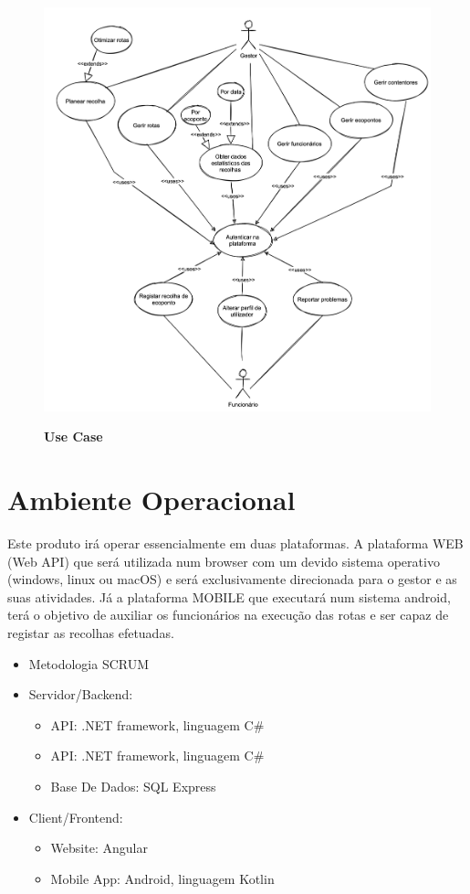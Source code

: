 \documentclass{scrreprt}
\begin{document}
	\begin{figure}[H]
		\centering
		\includegraphics[scale=.60]{imagens/UseCase3}
		\par \textbf{Use Case}
		\label{fig:UseCase3}
	\end{figure}
	
	\newpage
	
	\section{Ambiente Operacional}
	Este produto irá operar essencialmente em duas plataformas.
	A plataforma WEB (Web API) que será utilizada num browser com um devido sistema operativo (windows, linux ou macOS) e será exclusivamente direcionada para o gestor e as suas atividades. Já a plataforma MOBILE que executará num sistema android, terá o objetivo de auxiliar os funcionários na execução das rotas e ser capaz de registar as recolhas efetuadas.
	
	\begin{itemize}
		\item Metodologia SCRUM
		\item Servidor/Backend:
		\begin{itemize}
			\item API: .NET framework, linguagem C\# 
			\item API: .NET framework, linguagem C\# 
			\item Base De Dados: SQL Express
		\end{itemize}
		\item Client/Frontend: 
		\begin{itemize}
			\item Website: Angular
			\item Mobile App: Android, linguagem Kotlin
		\end{itemize}
	\end{itemize}
	
\end{document}
